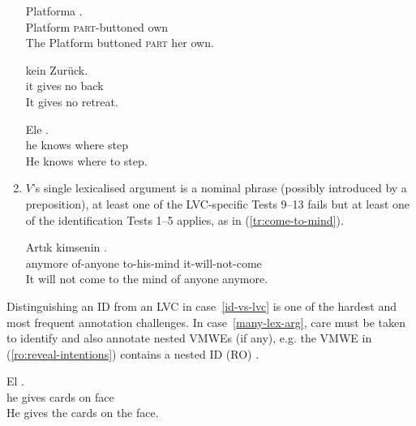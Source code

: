 \documentclass[output=paper,
modfonts,
]{langscibook}
\begin{document}
\begin{enumerate}
\ea \label{pl:dopiac-swego}
\settowidth {}
\gll Platforma  . \\
Platform \textsc{part}-buttoned own\\ 
\glt The Platform buttoned \textsc{part} her own. 
\z

\ea \label{de:es-gibt}
\settowidth {}
\gll  {}   kein Zurück.\\
it gives no back\\ 
\glt It gives no retreat. 
\z

\ea \label{pt:saber-onde-pisar}
\settowidth {}
\gll Ele  \underline{} \underline{}. \\
he knows where step\\ 
\glt He knows where to step. 
\z

\item\label{id-vs-lvc} $V$'s single lexicalised argument is a nominal phrase (possibly introduced by a preposition), at least one of the  LVC-specific Tests 9--13 fails but at least one of the identification Tests 1--5 applies, as in (\ref{tr:come-to-mind}).

\ea \label{tr:come-to-mind}
\settowidth {}
\gll Artık kimsenin  .\\
anymore of-anyone to-his-mind it-will-not-come\\ 
\glt It will not come to the mind of anyone anymore. 
\z

\end{enumerate}

Distinguishing an ID from an LVC in case~\ref{id-vs-lvc} is one of the hardest and most frequent annotation challenges.  In case~\ref{many-lex-arg}, care must be taken to identify and also annotate nested VMWEs (if any), e.g. the VMWE in (\ref{ro:reveal-intentions}) 
contains a nested ID (RO) . 

\ea \label{ro:reveal-intentions}
\settowidth {}
\gll El    . \\
he gives cards on face\\ 
\glt He gives the cards on the face. 
\z
\end{document}

